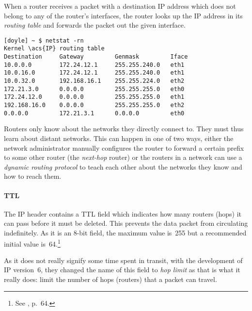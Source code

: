 \noindent
\usebox\lstrouterTwo

When a router receives a packet with a destination \acs{IP} address which does not belong to any of the router's interfaces, the router looks up the \acs{IP} address in its \emph{routing table} and forwards the packet out the given interface.%

\newsavebox{\lstrouterThree}
\begin{lrbox}{\lstrouterThree}
\begin{lstlisting}[caption={The routing table on a linux machine},label={fig:routing-table}]
[doyle] ~ $ netstat -rn
Kernel \acs{IP} routing table
Destination     Gateway         Genmask         Iface
10.0.0.0        172.24.12.1     255.255.240.0   eth1
10.0.16.0       172.24.12.1     255.255.240.0   eth1
10.0.32.0       192.168.16.1    255.255.224.0   eth2
172.21.3.0      0.0.0.0         255.255.255.0   eth0
172.24.12.0     0.0.0.0         255.255.255.0   eth1
192.168.16.0    0.0.0.0         255.255.255.0   eth2
0.0.0.0         172.21.3.1      0.0.0.0         eth0
\end{lstlisting}
\end{lrbox}
\noindent
\usebox\lstrouterThree

Routers only know about the networks they directly connect to.
They must thus learn about distant networks.
This can happen in one of two ways, either the network administrator manually configures the router to forward a certain prefix to some other router (the \emph{next-hop} router) or the routers in a network can use a \emph{dynamic routing protocol} to teach each other about the networks they know and how to reach them.

\paragraph{\acl{TTL}}
The \acs{IP} header contains a \gls{TTL} field which indicates how many routers (hops) it can pass before it must be deleted.
This prevents the data packet from circulating indefinitely.
As it is an 8-bit field, the maximum value is~255 but a recommended initial value is~64.\footnote{See , p.~64.}

As it does not really signify some time spent in transit, with the development of \acs{IP} version~6, they changed the name of this field to \emph{hop limit} as that is what it really does: limit the number of hops (routers) that a packet can travel.


